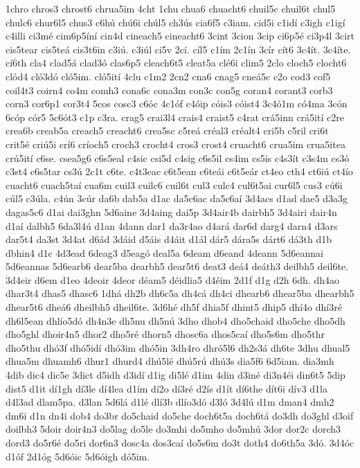 {1chro
chros3
chrost6
chrua5im
4cht
1chu
chua6
chuacht6
chuil5c
chuil6t
chul5
chulc6
chur6l5
chus3
c6hú
chú6i
chúl5
ch3ús
cia6f5
c3iam.
cid5i
c1idí
c3igh
c1igí
c4illi
ci3mé
cim6p5íní
cin4d
cineach5
cineacht6
3cint
3cion
3cip
ci6p5é
ci3p4l
3cirt
cis5tear
cis5teá
cis3t6in
c3iú.
c3iúl
ci5v
2cí.
cíl5
c1ím
2c1ín
3cír
cít6
3c4ít.
3c4íte.
cí6th
cla4
clad5á
clad3ó
clas6p5
cleach6t5
cleat5a
clé6i
clim5
2clo
cloch5
clocht6
clód4
cló3dó
cló5im.
cló5ití
4clu
c1m2
2cn2
cna6
cnag5
cneá5c
c2o
cod3
cof5
coil4t3
coirn4
co4m
comh3
cona6c
cona3m
con3c
con5g
coran4
corant3
corb3
corn3
cor6p1
cor3t4
5cos
cosc3
c6óc
4c1óf
c4óip
cóis3
cóist4
3c4ó1m
có4ma
3cón
6cóp
cór5
5c6ót3
c1p
c3ra.
crag5
crai3l4
crais4
craist5
c4rat
crá5inn
crá5ití
c2re
crea6b
creab5a
creach5
creacht6
crea5sc
c5reá
créal3
créalt4
cri5b
c5ril
cri6t
crit5é
criú5i
crí6
críoch5
croch3
crocht4
cros3
crost4
cruacht6
crua5im
crua5itea
crú5ití
c6se.
csea5g6
c6s5eal
c4sic
csi5d
c4sig
c6s5il
cs4im
cs5is
c4s3ít
c3s4m
cs3ó
c3st4
c6s5tar
cs3ú
2c1t
c6te.
c4t3eac
c6t5ean
c6teái
c6t5eár
ct4eo
cth4
ct6iú
ct4ío
cuacht6
cuach5taí
cua6m
cuil3
cuilc6
cuil6t
cul3
culc4
cul6t5ai
cur6l5
cus3
cú6i
cúl5
c3úla.
c4ún
3cúr
da6b
dab5a
d1ac
da5c6ac
da5c6aí
3d4acs
d1ad
dae5
d3a3g
dagas5c6
d1ai
dai3ghn
5d6aine
3d4aing
dai5p
3d4air4b
dairbh5
3d4airi
dair4n
d1aí
dalbh5
6da3l4ú
d1an
4dann
dar1
da3r4ao
d4ará
dar6d
darg4
darn4
d3ars
dar5t4
da3st
3d4at
d6ád
3dáid
d5áis
d4áit
d1ál
dár5
dára5s
dárt6
dá3th
d1b
dbhin4
d1c
4d3ead
6deag3
d5eagó
deal5a
6deam
d6eand
4deann
5d6eannai
5d6eannas
5d6earb6
dear5ba
dearbh5
dear5t6
deat3
deá4
deáth3
deilbh5
deil6te.
3d4eir
d6em
d1eo
4deoir
4deor
déam5
déidlia5
d4éim
2d1f
d1g
d2h
6dh.
dh4ao
dhar3t4
dhas5
dhasc6
1dhá
dh2b
dh6c5a
dh4cá
dh4ci
dhearb6
dhear5ba
dhearbh5
dhear5t6
dheá6
dheilbh5
dheil6te.
3d6hé
dh5f
dhia5f
dhint5
dhip5
dhí4o
dhí3ré
dh6l5ean
dhlío5dó
dh4n3e
dh5nu
dh5nú
3dho
dhob4
dho5chaid
dho5che
dho5dh
dho5ghl
dhoir4n5
dhor2
dho5ré
dhorn5
dhosc6a
dhos5caí
dho5s6m
dho5thr
dho5thu
dhó3f
dhó5idí
dhó3im
dhó5in
3dh4ro
dhró5l6
dh2s3á
dh6te
3dhu
dhual5
dhua5m
dhuamh6
dhur1
dhurd4
dhú5lé
dhú5rú
dhú3s
dia5f6
6d5iam.
dia3mh
4dib
dic4
dic5e
3dict
d5idh
d3idí
d1ig
di5lé
d1im
4din
d3iné
di3n4éi
din6t5
5dip
dist5
d1it
dí1gh
dí3le
dí4lea
d1ím
dí2o
dí3ré
d2ís
d1ít
dí6the
dít6i
dív3
d1la
d4l3ad
dlam5pa.
d3lan
5d6lá
d1lé
dlí3b
dlío3dó
d3ló
3d4lú
d1m
dman4
dmh2
dm6i
d1n
dn4i
dob4
do3br
do5chaid
do5che
doch6t5a
doch6tá
do3dh
do3ghl
d3oif
doilbh3
5doir
doir4n3
do5lag
do5le
do3mhi
do5mho
do5mhú
3dor
dor2c
dorch3
dord3
do5r6é
do5ri
dor6n3
dosc4a
dos3caí
do5s6m
do3t
doth4
do6th5a
3dó.
3d4óc
d1óf
2d1óg
5d6óic
5d6óigh
dó5im.
}

